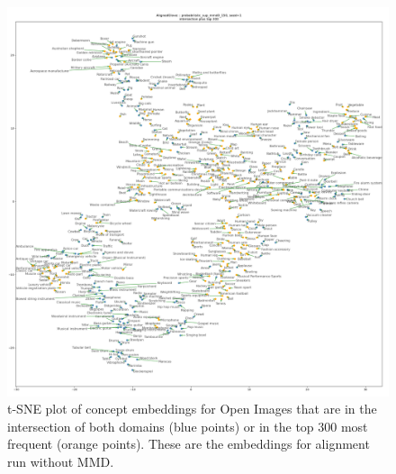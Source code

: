 \begin{figure}[H]
    \centering
    \includegraphics[width=\textwidth]{images/results/intersection_top300_tsne_openimages_probabilistic_sup_mmd0_150_AlignedGlove_1.png}
    \caption{
        t-SNE plot of concept embeddings for Open Images that are in the intersection of both domains (blue points) or in the top 300 most frequent (orange points). These are the embeddings for alignment run without MMD. 
    }
\end{figure}

